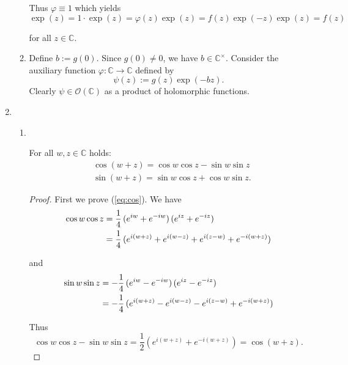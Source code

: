 \begin{enumerate}[label = \textbf{Exercise \arabic*.},wide = 0pt, itemsep=1.5ex]
\begin{enumerate}[label = (\alph*),wide = 0pt, itemsep=1.5ex]
	Thus $\varphi \equiv 1$ which yields
	\begin{equation}
		\exp(z) = 1\cdot \exp(z) = \varphi(z)\exp(z) = f(z)\exp(-z)\exp(z) = f(z)
	\end{equation}

	\noindent for all $z \in \mathbb{C}$.
\item Define $b := g(0)$. Since $g(0) \neq 0$, we have $b \in \mathbb{C}^\times$. Consider 
	the auxiliary function $\varphi: \mathbb{C} \to \mathbb{C}$ defined by
			\begin{equation}
				\psi(z) := g(z)\exp(-bz).
			\end{equation}
		Clearly $\psi \in \mathcal{O}(\mathbb{C})$ as a product of holomorphic functions. 
	\end{enumerate}

\item
	~
	\begin{enumerate}[label = (\alph*),wide = 0pt, itemsep=1.5ex]
		\item 
			~
			\begin{proposition}
				For all $w,z \in \mathbb{C}$ holds: 
				\begin{align}
					&\cos(w + z) = \cos w \cos z - \sin w \sin z\label{eq:cos}\\
					&\sin(w + z) = \sin w \cos z + \cos w \sin z\label{eq:sin}.
				\end{align}
			\end{proposition}

			\begin{proof}
				First we prove (\ref{eq:cos}). We have 
				\begin{align*}
					\cos w \cos z &= \frac{1}{4}\del[0]{e^{iw} + e^{-iw}}\del[0]{e^{iz} + e^{-iz}}\\ &= \frac{1}{4}\del[0]{e^{i(w + z)} + e^{i(w - z)} + e^{i(z - w)} + e^{-i(w + z)}}
				\end{align*}

				\noindent and
				\begin{align*}
					\sin w \sin z &= -\frac{1}{4}\del[0]{e^{iw} - e^{-iw}}\del[0]{e^{iz} - e^{-iz}}\\ &= -\frac{1}{4}\del[0]{e^{i(w + z)} - e^{i(w - z)} - e^{i(z - w)} + e^{-i(w + z)}}
				\end{align*}

				Thus
				\begin{equation}
					\cos w \cos z - \sin w \sin z = \frac{1}{2}(e^{i(w + z)} + e^{-i(w + z)}) = \cos(w + z).
				\end{equation}


\end{proof}
\end{enumerate}
\end{enumerate}

